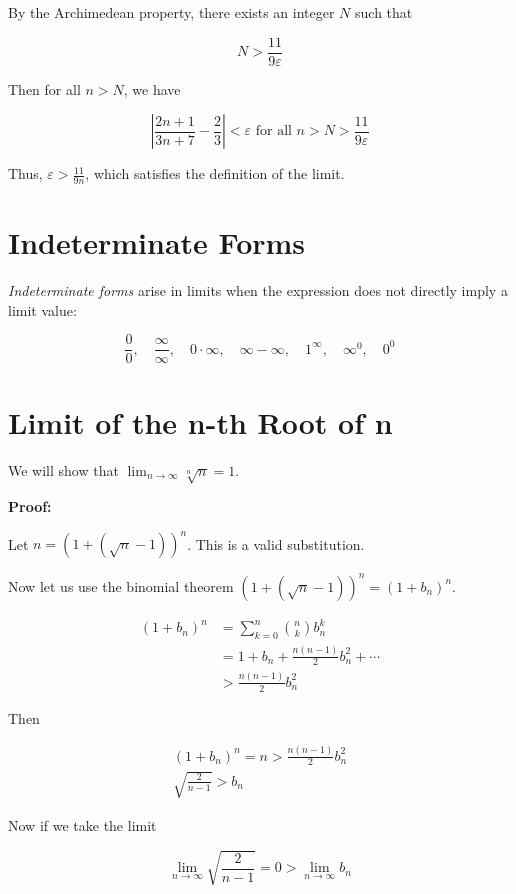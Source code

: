 By the Archimedean property, there exists an integer \(N\) such that    

\[
    N > \frac{11}{9 \varepsilon}
\]

Then for all \(n > N\), we have

\[
    \left| \frac{2n + 1}{3n + 7} - \frac{2}{3} \right| < \varepsilon \text{ for all } n > N > \frac{11}{9 \varepsilon}
\]  

Thus, \(\varepsilon > \frac{11}{9n}\), which satisfies the definition of the limit.

\QED


\section{Indeterminate Forms}

\emph{Indeterminate forms} arise in limits when the expression does not directly imply a limit value:

\[
    \frac{0}{0}, \quad \frac{\infty}{\infty}, \quad 0 \cdot \infty, \quad \infty - \infty, \quad 1^\infty, \quad \infty^0, \quad 0^0
\]

\section{Limit of the n-th Root of n}

We will show that \(\lim_{n \to \infty} \sqrt[n]{n} = 1\).

\textbf{Proof:}

Let \(n = (1 + (\sqrt{n} -1))^n\). This is a valid substitution. 

Now let us use the binomial theorem \((1 + (\sqrt{n} -1))^n = (1 + b_n)^n\).  

\begin{align*}
    (1 + b_n)^n &= \sum_{k = 0}^{n} \binom{n}{k} b_n^k \\ 
     &= 1 + b_{n} + \frac{n(n - 1)}{2} b_{n}^{2} + \cdots\\ 
     &> \frac{n(n - 1)}{2} b_{n}^{2} 
\end{align*}

Then 

\begin{align*}
   (1 + b_n)^n = n > \frac{n(n - 1)}{2} b_{n}^{2} \\ 
   \sqrt{\frac{2}{n - 1}} > b_n
\end{align*}

Now if we take the limit 

\[
    \lim_{n \to \infty} \sqrt{\frac{2}{n - 1}} = 0 > \lim_{n \to \infty} b_n
\]

